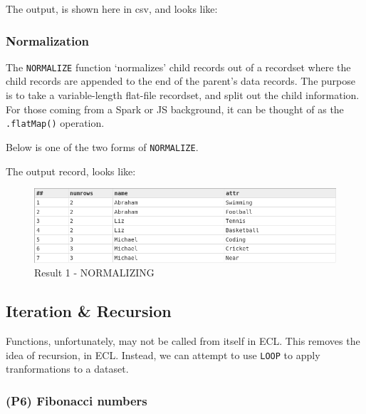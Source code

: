 

The output, is shown here in csv, and looks like:








\subsubsection{Normalization}

The \lstinline{NORMALIZE} function `normalizes' child records out of a recordset where the child records are appended to the end of the parent's data records. The purpose is to take a variable-length flat-file recordset, and split out the child information. For those coming from a Spark or JS background, it can be thought of as the \lstinline{.flatMap()} operation. 

Below is one of the two forms of \lstinline{NORMALIZE}.



The output record, looks like:

\begin{figure}[h]
    \centering
    \includegraphics[width=.8\linewidth]{../output/28/1}
    \caption{Result 1 - NORMALIZING}
\end{figure}

\subsection{Iteration \& Recursion}

Functions, unfortunately, may not be called from itself in ECL. This removes the idea of recursion, in ECL.
Instead, we can attempt to use \lstinline{LOOP} to apply tranformations to a dataset.


\subsubsection{(P6) Fibonacci numbers}

